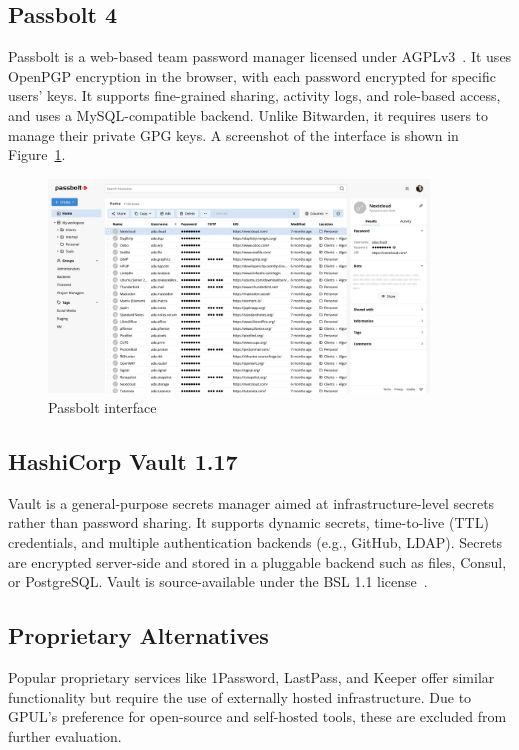 \subsection*{Passbolt 4}
Passbolt is a web-based team password manager licensed under AGPLv3~\cite{passbolt-security}. It uses OpenPGP encryption in the browser, with each password encrypted for specific users' keys. It supports fine-grained sharing, activity logs, and role-based access, and uses a MySQL-compatible backend. Unlike Bitwarden, it requires users to manage their private GPG keys. A screenshot of the interface is shown in Figure~\ref{fig:passbolt-ui}.

\begin{figure}[H]
  \centering
  \includegraphics[width=0.9\textwidth]{imaxes/passbolt-ui.png}
  \caption{Passbolt interface}
  \label{fig:passbolt-ui}
\end{figure}

\subsection*{HashiCorp Vault 1.17}
Vault is a general-purpose secrets manager aimed at infrastructure-level secrets rather than password sharing. It supports dynamic secrets, time-to-live (TTL) credentials, and multiple authentication backends (e.g., GitHub, LDAP). Secrets are encrypted server-side and stored in a pluggable backend such as files, Consul, or PostgreSQL. Vault is source-available under the BSL 1.1 license~\cite{vault-bsl}.

\subsection*{Proprietary Alternatives}
Popular proprietary services like 1Password, LastPass, and Keeper offer similar functionality but require the use of externally hosted infrastructure. Due to GPUL's preference for open-source and self-hosted tools, these are excluded from further evaluation.

